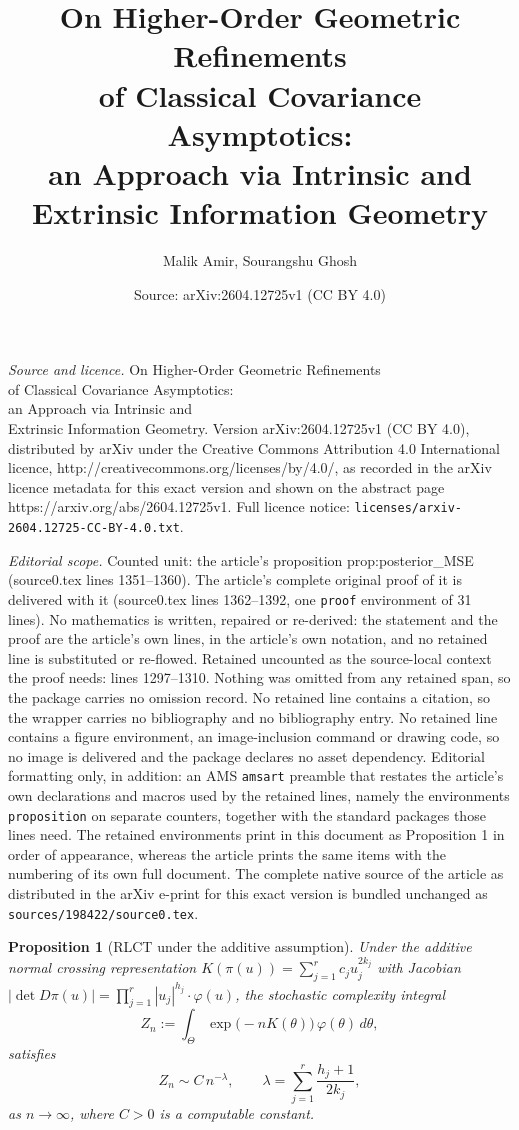 \documentclass[10pt,a4paper]{amsart}
\title{On Higher-Order Geometric Refinements\\ of Classical Covariance Asymptotics:\\ an Approach via Intrinsic and\\ Extrinsic Information Geometry}
\author{Malik Amir, Sourangshu Ghosh}
\date{Source: arXiv:2604.12725v1 (CC BY 4.0)}
\newtheorem{proposition}{Proposition}
\begin{document}
\maketitle

\noindent\emph{Source and licence.} On Higher-Order Geometric Refinements\\ of Classical Covariance Asymptotics:\\ an Approach via Intrinsic and\\ Extrinsic Information Geometry. Version arXiv:2604.12725v1 (CC BY 4.0), distributed by arXiv under the Creative Commons Attribution 4.0 International licence, http://creativecommons.org/licenses/by/4.0/, as recorded in the arXiv licence metadata for this exact version and shown on the abstract page https://arxiv.org/abs/2604.12725v1. Full licence notice: \texttt{licenses/arxiv-2604.12725-CC-BY-4.0.txt}.\par\smallskip

\noindent\textit{Editorial scope.} Counted unit: the article's proposition prop:posterior\_MSE (source0.tex lines 1351--1360). The article's complete original proof of it is delivered with it (source0.tex lines 1362--1392, one \texttt{proof} environment of 31 lines). No mathematics is written, repaired or re-derived: the statement and the proof are the article's own lines, in the article's own notation, and no retained line is substituted or re-flowed.  Retained uncounted as the source-local context the proof needs: lines 1297--1310.  Nothing was omitted from any retained span, so the package carries no omission record.  No retained line contains a citation, so the wrapper carries no bibliography and no bibliography entry.  No retained line contains a figure environment, an image-inclusion command or drawing code, so no image is delivered and the package declares no asset dependency.  Editorial formatting only, in addition: an AMS \texttt{amsart} preamble that restates the article's own declarations and macros used by the retained lines, namely the environments \texttt{proposition} on separate counters, together with the standard packages those lines need.  The retained environments print in this document as Proposition 1 in order of appearance, whereas the article prints the same items with the numbering of its own full document.  The complete native source of the article as distributed in the arXiv e-print for this exact version is bundled unchanged as \texttt{sources/198422/source0.tex}.
\begin{proposition}[RLCT under the additive assumption]
\label{prop:RLCT_additive}
Under the additive normal crossing representation $K(\pi(u)) = \sum_{j=1}^r c_j u_j^{2k_j}$ with Jacobian $|\det D\pi(u)| = \prod_{j=1}^r |u_j|^{h_j} \cdot \varphi(u)$, the stochastic complexity integral
\[
Z_n := \int_{\Theta} \exp\big(-n K(\theta)\big) \, \varphi(\theta)\, d\theta,
\]
satisfies
\[
Z_n \sim C \, n^{-\lambda},
\qquad
\lambda = \sum_{j=1}^r \frac{h_j + 1}{2k_j},
\]
as $n \to \infty$, where $C > 0$ is a computable constant.
\end{proposition}
\end{document}
